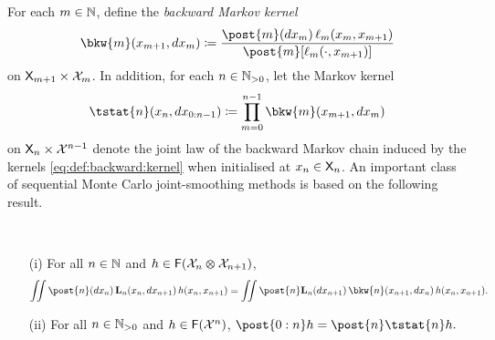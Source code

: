 For each $m \in \mathbb{N}$, define the  \emph{backward Markov kernel} 
\begin{equation} \label{eq:def:backward:kernel}
    \bkw{m}(x_{m + 1}, \rmd x_m) \eqdef \frac{\post{m}(\rmd x_m) \, \ud{m}(x_m, x_{m + 1})}{\post{m}[\ud{m}(\cdot, x_{m + 1})]}
\end{equation}
on $\mathsf{X}_{m + 1} \times \mathcal{X}_m$. In addition, for each $n \in \mathbb{N}_{> 0}$, let the Markov kernel   
\begin{equation} \label{eq:def:tstat}
\tstat{n}(x_n, \rmd x_{0:n - 1}) \eqdef \prod_{m = 0}^{n - 1} \bkw{m}(x_{m + 1}, \rmd x_m)
\end{equation}
on $\mathsf{X}_n \times \mathcal{X}^{n - 1}$ denote the joint law of the backward Markov chain induced by the kernels \eqref{eq:def:backward:kernel} when initialised at $x_n \in \mathsf{X}_n$. An important class of sequential Monte Carlo joint-smoothing methods \cite{doucet2000sequential,godsill:doucet:west:2004} is based on the following result. 
\begin{lemma} 
\label{lem:reversibility}
\ 

\begin{itemize} 
\item[(i)]
For all $n \in \mathbb{N}$ and $h \in \mathsf{F}(\mathcal{X}_n \varotimes \mathcal{X}_{n + 1})$, 
\begin{equation} \label{eq:reversibility}
\iint \post{n}(\rmd x_n) \, \uk{n}(x_n, \rmd x_{n + 1}) \, h(x_n, x_{n + 1}) = \iint \post{n} \uk{n}(\rmd x_{n + 1}) \, \bkw{n}(x_{n + 1}, \rmd x_n) \, h(x_n, x_{n + 1}). 
\end{equation}
\item[(ii)]
For all $n \in \mathbb{N}_{> 0}$ and $h \in \mathsf{F}(\mathcal{X}^n)$, 
$
\post{0:n} h = \post{n} \tstat{n} h. 
$
\end{itemize}
\end{lemma}

